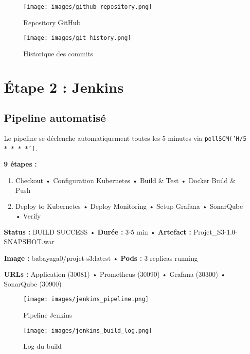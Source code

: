 \documentclass[11pt,a4paper]{article}
\begin{document}
\begin{figure}[H]
    \centering
    \texttt{[image: images/github\_repository.png]}
    \caption{Repository GitHub}
\end{figure}

\begin{figure}[H]
    \centering
    \texttt{[image: images/git\_history.png]}
    \caption{Historique des commits}
\end{figure}

\newpage

\section{Étape 2 : Jenkins}

\subsection{Pipeline automatisé}
Le pipeline se déclenche automatiquement toutes les 5 minutes via \texttt{pollSCM('H/5 * * * *')}.

\textbf{9 étapes :}
\begin{enumerate}
    \item Checkout • Configuration Kubernetes • Build \& Test • Docker Build \& Push
    \item Deploy to Kubernetes • Deploy Monitoring • Setup Grafana • SonarQube • Verify
\end{enumerate}

\begin{tcolorbox}[colback=green!5!white,colframe=green!75!black,title=Résultats]
    \textbf{Status :} BUILD SUCCESS • \textbf{Durée :} 3-5 min • \textbf{Artefact :} Projet\_S3-1.0-SNAPSHOT.war
    
    \textbf{Image :} babayaga0/projet-s3:latest • \textbf{Pods :} 3 replicas running
\end{tcolorbox}

\textbf{URLs :} Application (30081) • Prometheus (30090) • Grafana (30300) • SonarQube (30900)

\begin{figure}[H]
    \centering
    \texttt{[image: images/jenkins\_pipeline.png]}
    \caption{Pipeline Jenkins}
\end{figure}

\begin{figure}[H]
    \centering
    \texttt{[image: images/jenkins\_build\_log.png]}
    \caption{Log du build}
\end{figure}
\end{document}
